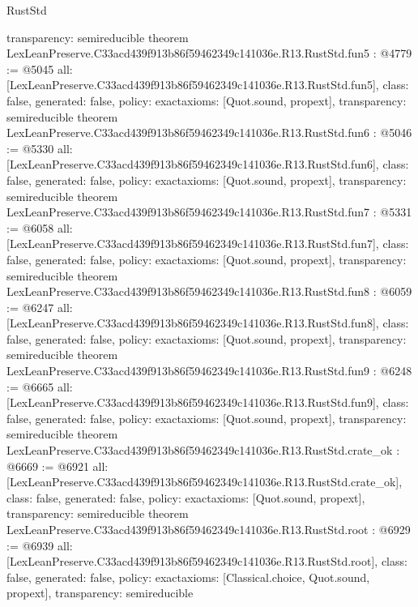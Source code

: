 \begin{lexlean}{RustStd}
\begin{coremodule}
{  transparency: semireducible
}
theorem LexLeanPreserve.C33acd439f913b86f59462349c141036e.R13.RustStd.fun5 : @4779 := @5045 {
  all: [LexLeanPreserve.C33acd439f913b86f59462349c141036e.R13.RustStd.fun5],
  class: false,
  generated: false,
  policy: exact{axioms: [Quot.sound, propext]},
  transparency: semireducible
}
theorem LexLeanPreserve.C33acd439f913b86f59462349c141036e.R13.RustStd.fun6 : @5046 := @5330 {
  all: [LexLeanPreserve.C33acd439f913b86f59462349c141036e.R13.RustStd.fun6],
  class: false,
  generated: false,
  policy: exact{axioms: [Quot.sound, propext]},
  transparency: semireducible
}
theorem LexLeanPreserve.C33acd439f913b86f59462349c141036e.R13.RustStd.fun7 : @5331 := @6058 {
  all: [LexLeanPreserve.C33acd439f913b86f59462349c141036e.R13.RustStd.fun7],
  class: false,
  generated: false,
  policy: exact{axioms: [Quot.sound, propext]},
  transparency: semireducible
}
theorem LexLeanPreserve.C33acd439f913b86f59462349c141036e.R13.RustStd.fun8 : @6059 := @6247 {
  all: [LexLeanPreserve.C33acd439f913b86f59462349c141036e.R13.RustStd.fun8],
  class: false,
  generated: false,
  policy: exact{axioms: [Quot.sound, propext]},
  transparency: semireducible
}
theorem LexLeanPreserve.C33acd439f913b86f59462349c141036e.R13.RustStd.fun9 : @6248 := @6665 {
  all: [LexLeanPreserve.C33acd439f913b86f59462349c141036e.R13.RustStd.fun9],
  class: false,
  generated: false,
  policy: exact{axioms: [Quot.sound, propext]},
  transparency: semireducible
}
theorem LexLeanPreserve.C33acd439f913b86f59462349c141036e.R13.RustStd.crate_ok : @6669 := @6921 {
  all: [LexLeanPreserve.C33acd439f913b86f59462349c141036e.R13.RustStd.crate_ok],
  class: false,
  generated: false,
  policy: exact{axioms: [Quot.sound, propext]},
  transparency: semireducible
}
theorem LexLeanPreserve.C33acd439f913b86f59462349c141036e.R13.RustStd.root : @6929 := @6939 {
  all: [LexLeanPreserve.C33acd439f913b86f59462349c141036e.R13.RustStd.root],
  class: false,
  generated: false,
  policy: exact{axioms: [Classical.choice, Quot.sound, propext]},
  transparency: semireducible
}


\end{coremodule}
\end{lexlean}
